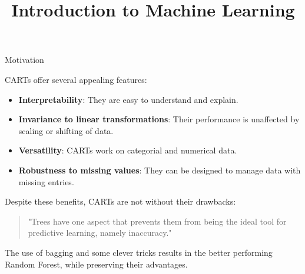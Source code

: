 \documentclass[11pt,compress,t,notes=noshow, xcolor=table]{beamer}
\title{Introduction to Machine Learning}
\institute{\href{https://compstat-lmu.github.io/lecture_i2ml/}{compstat-lmu.github.io/lecture\_i2ml}}
\date{}
\begin{document}
\sloppy

\begin{vbframe}{Motivation}

CARTs offer several appealing features:

\begin{itemize}
  \item \textbf{Interpretability}: They are easy to understand and explain.
  \item \textbf{Invariance to linear transformations}: Their performance is unaffected by scaling or shifting of data.
  \item \textbf{Versatility}: CARTs work on categorial and numerical data.
  \item \textbf{Robustness to missing values}: They can be designed to manage data with missing entries.
\end{itemize}

\vspace{1em}
Despite these benefits, CARTs are not without their drawbacks:
\vspace{1em}

\begin{quotation}
"Trees have one aspect that prevents them from being the ideal tool for predictive learning, namely inaccuracy."
\end{quotation}

\vspace{1em}
The use of bagging and some clever tricks results in the better performing Random Forest,
while preserving their advantages.

\end{vbframe}
\end{document}
